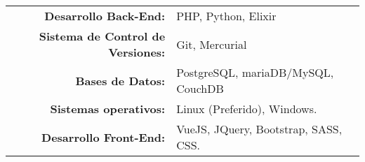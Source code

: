 \documentclass[lighthipsterblue]{monocolnavbarcv}
\begin{document}
\begin{paracol}{2}
\begin{tabular}{r| p{\paracolwidth}}
  \end{tabular}

  \medskip

  \begin{tabular}{>{\small\bfseries}r >{\small}p{\paracolwidth}}
    Desarrollo Back-End: & PHP, Python, Elixir \\
    Sistema de Control de Versiones: & Git, Mercurial \\
    Bases de Datos: & PostgreSQL, mariaDB/MySQL, CouchDB \\
    Sistemas operativos: & Linux (Preferido), Windows. \\
    Desarrollo Front-End: & VueJS, JQuery, Bootstrap, SASS, CSS.\@
  \end{tabular}
\end{paracol}
\end{document}
